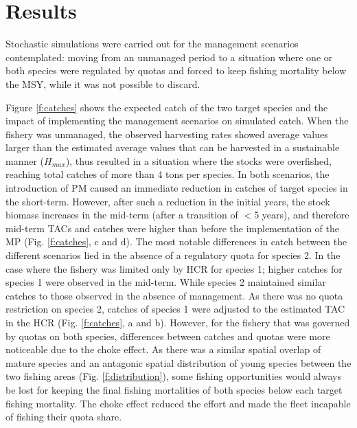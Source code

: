 \documentclass[12pt,oneline,a4paper,numbib]{ouparticle}
\numberwithin{equation}{subsection} %
\begin{document}

\section{Results}

Stochastic simulations were carried out for the management scenarios contemplated: moving from an unmanaged period to a situation where one or both species were regulated by quotas and forced to keep fishing mortality below the MSY, while it was not possible to discard. 

Figure \ref{f:catches} shows the expected catch of the two target species and the impact of implementing the management scenarios on simulated catch. When the fishery was unmanaged, the observed harvesting rates showed average values larger than the estimated average values that can be harvested in a sustainable manner ($H_{max}$), thus resulted in a situation where the stocks were overfished, reaching total catches of more than 4 tons per species. In both scenarios, the introduction of PM caused an immediate reduction in catches of target species in the short-term. However, after such a reduction in the initial years, the stock biomass increases in the mid-term (after a transition of $<$5 years), and therefore mid-term TACs and catches were higher than before the implementation of the MP (Fig. \ref{f:catches}, c and d). The most notable differences in catch between the different scenarios lied in the absence of a regulatory quota for species 2. In the case where the fishery was limited only by HCR for species 1; higher catches for species 1 were observed in the mid-term. While species 2 maintained similar catches to those observed in the absence of management. As there was no quota restriction on species 2, catches of species 1 were adjusted to the estimated TAC in the HCR (Fig. \ref{f:catches}, a and b). However, for the fishery that was governed by quotas on both species, differences between catches and quotas were more noticeable due to the choke effect. As there was a similar spatial overlap of mature species and an antagonic spatial distribution of young species between the two fishing areas (Fig. \ref{f:distribution}), some fishing opportunities would always be lost for keeping the final fishing mortalities of both species below each target fishing mortality. The choke effect reduced the effort and made the fleet incapable of fishing their quota share.
\end{document}
